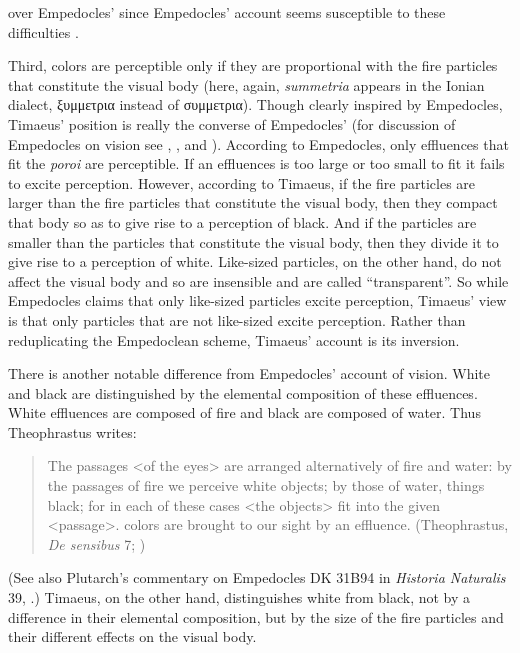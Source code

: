 over Empedocles' since Empedocles' account seems susceptible to these difficulties \citep[6]{Kalderon:2015fr}.

Third, colors are perceptible only if they are proportional with the fire particles that constitute the visual body (here, again, \emph{summetria} appears in the Ionian dialect, {\sbl ξυμμετρια} instead of {\sbl συμμετρια}). Though clearly inspired by Empedocles, Timaeus' position is really the converse of Empedocles' (for discussion of Empedocles on vision see \citealt{Sedley:1992uq}, \citealt{Ierodiakonou:2005fk}, and \citealt[chapter 1]{Kalderon:2015fr}). According to Empedocles, only effluences that fit the \emph{poroi} are perceptible. If an effluences is too large or too small to fit it fails to excite perception. However, according to Timaeus, if the fire particles are larger than the fire particles that constitute the visual body, then they compact that body so as to give rise to a perception of black. And if the particles are smaller than the particles that constitute the visual body, then they divide it to give rise to a perception of white. Like-sized particles, on the other hand, do not affect the visual body and so are insensible and are called ``transparent''. So while Empedocles claims that only like-sized particles excite perception, Timaeus' view is that only particles that are not like-sized excite perception. Rather than reduplicating the Empedoclean scheme, Timaeus' account is its inversion.

There is another notable difference from Empedocles' account of vision. White and black are distinguished by the elemental composition of these effluences. White effluences are composed of fire and black are composed of water. Thus Theophrastus writes: 
\begin{quote}
	The passages <of the eyes> are arranged alternatively of fire and water: by the passages of fire we perceive white objects; by those of water, things black; for in each of these cases <the objects> fit into the given <passage>. colors are brought to our sight by an effluence. (Theophrastus, \emph{De sensibus} 7; \citealt[71--3]{Stratton:1917vn})
\end{quote}
(See also Plutarch's commentary on Empedocles DK 31B94 in \emph{Historia Naturalis} 39, \citealt[CTXT-87 137--8]{Inwood:2001ve}.) Timaeus, on the other hand, distinguishes white from black, not by a difference in their elemental composition, but by the size of the fire particles and their different effects on the visual body. 

